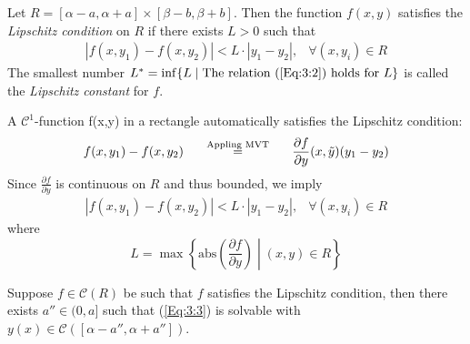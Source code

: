 \begin{definition}
Let $R=[\alpha-a,\alpha+a]\times[\beta-b,\beta+b]$. Then the function $f(x,y)$ satisfies the \emph{Lipschitz condition} on $R$ if there exists $L>0$ such that
\begin{equation}\label{Eq:3:2}
\begin{array}{ll}
|f(x,y_1)-f(x,y_2)|<L\cdot |y_1-y_2|,
&
\forall (x,y_i)\in R
\end{array}
\end{equation}
The smallest number $L^*=\inf\{L\mid\text{The relation (\ref{Eq:3:2}) holds for $L$}\}$ is called the \emph{Lipschitz constant} for $f$.
\end{definition}

\begin{example}
A $\mathcal{C}^1$-function f(x,y) in a rectangle automatically satisfies the Lipschitz condition:
\[
f(x,y_1)-f(x,y_2)
\makebox[3cm][c]{$\overset{\text{Appling MVT}} =$}
\frac{\partial f}{\partial y}(x,\tilde y)(y_1-y_2)
\]
Since $\frac{\partial f}{\partial y}$ is continuous on $R$ and thus bounded, we imply
\[
\begin{array}{ll}
|f(x,y_1)-f(x,y_2)|<L\cdot |y_1-y_2|,
&
\forall (x,y_i)\in R
\end{array}
\]
where
\[
L=\max\left\{
\text{abs}\left(
\frac{\partial f}{\partial y}
\right)\middle|
(x,y)\in R
\right\}
\]
\end{example}

\begin{theorem}\label{The:3:4}
Suppose $f\in\mathcal{C}(R)$ be such that $f$ satisfies the Lipschitz condition, then there exists $a''\in(0,a]$ such that (\ref{Eq:3:3}) is solvable with $y(x)\in\mathcal{C}([\alpha-a'',\alpha+a''])$. 
\end{theorem}

